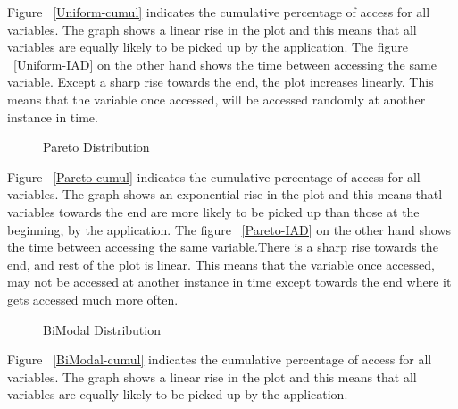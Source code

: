 Figure ~\ref{Uniform-cumul} indicates the cumulative percentage of access for all variables. The graph shows a linear rise in the plot and this means that all variables are equally likely to be picked up by the application. The figure ~\ref{Uniform-IAD} on the other hand shows the time between accessing the same variable. Except a sharp rise towards the end, the plot increases linearly. This means that the variable once accessed, will be accessed randomly at another instance in time. 

\begin{figure}
\centering
	\caption{Pareto Distribution} 
	\label{fig:EcUND} 
\end{figure} 

Figure ~\ref{Pareto-cumul} indicates the cumulative percentage of access for all variables. The graph shows an exponential rise in the plot and this means thatl variables towards the end are more likely to be picked up than those at the beginning, by the application. The figure ~\ref{Pareto-IAD} on the other hand shows the time between accessing the same variable.There is a sharp rise towards the end, and rest of the plot is linear. This means that the variable once accessed, may not be accessed at another instance in time except towards the end where it gets accessed much more often.

\begin{figure}
\centering
	\caption{BiModal Distribution} 
	\label{fig:EcUND} 
\end{figure} 

Figure ~\ref{BiModal-cumul} indicates the cumulative percentage of access for all variables. The graph shows a linear rise in the plot and this means that all variables are equally likely to be picked up by the application.